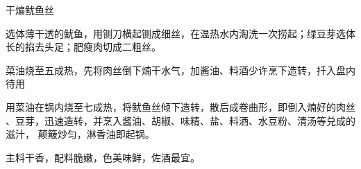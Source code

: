 \begin{recipe}{干煸鱿鱼丝}

\ingredients


\preparation

\step 选体薄干透的鱿鱼，用铡刀横起铡成细丝，在温热水内淘洗一次捞起；绿豆芽选体
长的掐去头足；肥瘦肉切成二粗丝。

\step 菜油烧至五成热，先将肉丝倒下煵干水气，加酱油、料酒少许烹下造转，扦入盘内
待用

\step 用菜油在锅内烧至七成热，将鱿鱼丝倾下造转，散后成卷曲形，即倒入煵好的肉丝
、豆芽，迅速造转，并烹入酱油、胡椒、味精、盐、料酒、水豆粉、清汤等兑成的滋汁，
颠簸炒匀，淋香油即起锅。

\features

主料干香，配料脆嫩，色美味鲜，佐酒最宜。

\end{recipe}

